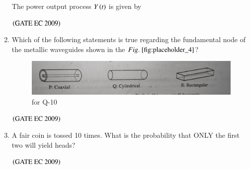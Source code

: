 \documentclass[journal,12pt,onecolumn]{IEEEtran}
\theoremstyle{remark}
\begin{document}
\begin{enumerate}[start=1, label={Q\arabic*.}]
The power output process $Y\left(t\right)$ is given by 

\begin{enumerate}
\end{enumerate}
\hfill $\left(\text{GATE EC 2009}\right)$

\item Which of the following statements is true regarding the fundamental node of the metallic waveguides shown in the $\figref{fig:placeholder_4}$?
\begin{figure}[H]
    \centering
    \includegraphics[width=0.5\columnwidth]{figs/img_4.jpg}
    \caption{\centering for Q-10}
    \label{fig:placeholder_4}
\end{figure}
\begin{enumerate}
\end{enumerate}
\hfill $\left(\text{GATE EC 2009}\right)$

\item A fair coin is tossed 10 times. What is the probability that ONLY the first two will yield heads?

\begin{enumerate}
\end{enumerate}
\hfill $\left(\text{GATE EC 2009}\right)$


\end{enumerate}
\end{document}
